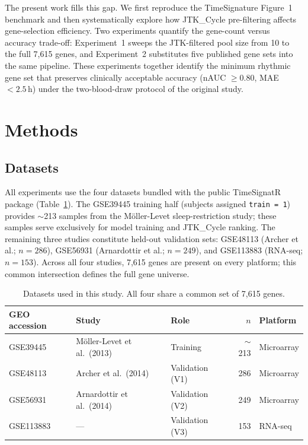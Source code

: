 \documentclass[10pt,a4paper]{article}
\begin{document}
The present work fills this gap.
We first reproduce the TimeSignature Figure~1 benchmark and then
systematically explore how JTK\_Cycle pre-filtering affects
gene-selection efficiency.
Two experiments quantify the gene-count versus accuracy trade-off:
Experiment~1 sweeps the JTK-filtered pool size from 10 to the full
7,615 genes, and Experiment~2 substitutes five published gene sets
into the same pipeline.
These experiments together identify the minimum rhythmic gene set
that preserves clinically acceptable accuracy (nAUC $\geq 0.80$,
MAE $< 2.5$\,h) under the two-blood-draw protocol of the original
study.

\section{Methods}
 
\subsection{Datasets}
 
All experiments use the four datasets bundled with the public
TimeSignatR package (Table~\ref{tab:datasets}).
The GSE39445 training half (subjects assigned \texttt{train\,=\,1})
provides ${\sim}$213 samples from the Möller-Levet sleep-restriction
study; these samples serve exclusively for model training and
JTK\_Cycle ranking.
The remaining three studies constitute held-out validation sets:
GSE48113 (Archer et al.; $n = 286$), GSE56931 (Arnardottir et al.;
$n = 249$), and GSE113883 (RNA-seq; $n = 153$).
Across all four studies, 7,615 genes are present on every platform;
this common intersection defines the full gene universe.
 
\begin{table}[h]
\centering
\caption{Datasets used in this study.  All four share a common
set of 7,615 genes.}
\label{tab:datasets}
\begin{tabular}{lllrl}
\toprule
GEO accession & Study & Role & $n$ & Platform \\
\midrule
GSE39445  & Möller-Levet et al.\ (2013) & Training      & ${\sim}$213 & Microarray \\
GSE48113  & Archer et al.\ (2014)       & Validation (V1) & 286 & Microarray \\
GSE56931  & Arnardottir et al.\ (2014)  & Validation (V2) & 249 & Microarray \\
GSE113883 & ---                          & Validation (V3) & 153 & RNA-seq \\
\bottomrule
\end{tabular}
\end{table}
 
\end{document}
